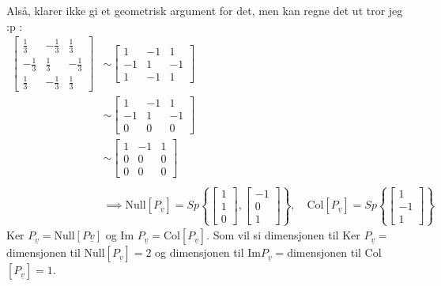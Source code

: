 \documentclass[11pt, a4paper, norsk]{NTNUoving}
\begin{document}
\begin{oppgave}
\begin{punkt}
            Alså, klarer ikke gi et geometrisk argument for det, men kan regne det ut tror jeg :p :
            \begin{align*}
                \begin{bmatrix}
                    \frac{1}{3} & -\frac{1}{3} & \frac{1}{3} \\
                    -\frac{1}{3} & \frac{1}{3} & -\frac{1}{3} \\
                    \frac{1}{3} & -\frac{1}{3} & \frac{1}{3}
                \end{bmatrix} &\sim \begin{bmatrix}
                1 & -1 & 1 \\
                -1 & 1 & -1 \\
                1 & -1 & 1
                \end{bmatrix}
                \\
                &\sim \begin{bmatrix}
                    1 & -1 & 1 \\
                    -1 & 1 & -1 \\
                    0 & 0 & 0
                \end{bmatrix}
                \\
                &\sim \begin{bmatrix}
                    1 & -1 & 1 \\
                    0 & 0 & 0 \\
                    0 & 0 & 0
                \end{bmatrix}
                \\
                \\
                &\implies \text{Null}[P_{\underline{v}}] = Sp\left\{\begin{bmatrix}
                    1 \\
                    1 \\
                    0
                \end{bmatrix}, \begin{bmatrix}
                    -1 \\
                    0 \\
                    1
            \end{bmatrix}\right\}, \quad \text{Col}[P_{\underline{v}}] = Sp\left\{\begin{bmatrix}
                1 \\
                -1 \\
                1
            \end{bmatrix}\right\}
            \end{align*}
            Ker $P_{\underline{v}} = $Null$[P\underline{v}]$ og Im $P_{\underline{v}} = $Col$[P_{\underline{v}}]$. Som vil si dimensjonen til Ker $P_{\underline{v}}= $dimensjonen til Null$[P_{\underline{v}}] = 2$ og dimensjonen til Im$P_{\underline{v}} = $dimensjonen til Col$[P_{\underline{v}}] = 1$.
        \end{punkt}
    \end{oppgave}
\end{document}
